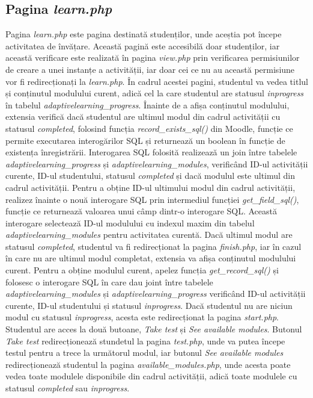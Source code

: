 \subsection{Pagina \textit{learn.php}}
Pagina \textit{learn.php} este pagina destinată studenților, unde aceștia pot începe activitatea de învățare. Această pagină este accesibilă doar studenților, iar această verificare este 
realizată în pagina \textit{view.php} prin verificarea permisiunilor de creare a unei instanțe a activității, iar doar cei ce nu au această permisiune vor fi redirecționați la 
\textit{learn.php}. În cadrul acestei pagini, studentul va vedea titlul și conținutul modulului curent, adică cel la care studentul are statusul \textit{inprogress} în tabelul 
\textit{adaptivelearning\_progress}. Înainte de a afișa conținutul modulului, extensia verifică dacă studentul are ultimul modul din cadrul activității cu statusul \textit{completed}, 
folosind funcția \textit{record\_exists\_sql()} din Moodle, funcție ce permite executarea interogărilor SQL și returnează un boolean în funcție de existența înregistrării. Interogarea SQL 
folosită realizează un join între tabelele \textit{adaptivelearning\_progress} și \textit{adaptivelearning\_modules}, verificând ID-ul activității curente, ID-ul studentului, statusul 
\textit{completed} și dacă modulul este ultimul din cadrul activității. Pentru a obține ID-ul ultimului modul din cadrul activității, realizez înainte o nouă interogare SQL prin intermediul 
funcției \textit{get\_field\_sql()}, funcție ce returnează valoarea unui câmp dintr-o interogare SQL. Această interogare selectează ID-ul modulului cu indexul maxim din tabelul
\textit{adaptivelearning\_modules} pentru activitatea curentă. Dacă ultimul modul are statusul \textit{completed}, studentul va fi redirecționat la pagina \textit{finish.php}, iar în 
cazul în care nu are ultimul modul completat, extensia va afișa conținutul modulului curent. Pentru a obține modulul curent, apelez funcția \textit{get\_record\_sql()} și folosesc o interogare SQL în care dau joint între tabelele 
\textit{adaptivelearning\_modules} și \textit{adaptivelearning\_progress} verificând ID-ul activității curente, ID-ul studentului și statusul \textit{inprogress}. Dacă studentul nu are 
niciun modul cu statusul \textit{inprogress}, acesta este redirecționat la pagina \textit{start.php}. Studentul are acces la două butoane, \textit{Take test} și \textit{See available modules}. 
Butonul \textit{Take test} redirecționează stundetul la pagina \textit{test.php}, unde va putea începe testul pentru a trece la următorul modul, iar butonul \textit{See available modules} 
redirecționează studentul la pagina \textit{available\_modules.php}, unde acesta poate vedea toate modulele disponibile din cadrul activității, adică toate modulele cu statusul
\textit{completed} sau \textit{inprogress}.

